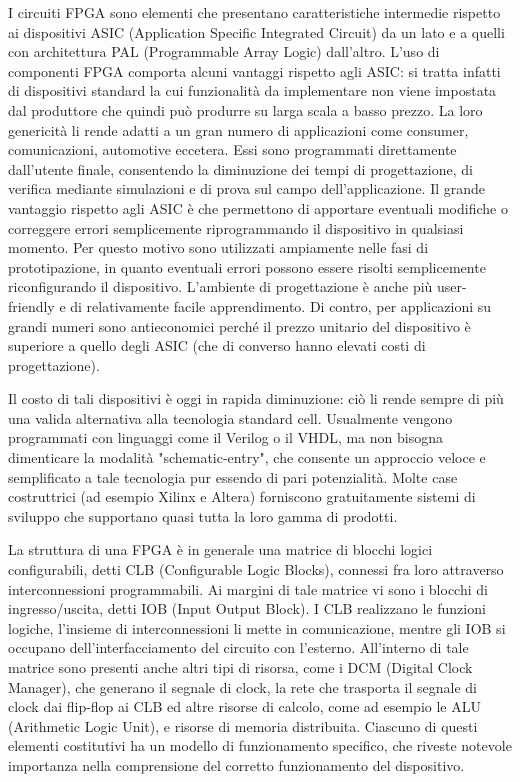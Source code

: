 \documentclass[a4paper,titlepage]{book}
\begin{document}
I circuiti FPGA sono elementi che presentano caratteristiche intermedie rispetto ai dispositivi ASIC (Application Specific Integrated Circuit) da un lato e a quelli con architettura PAL (Programmable Array Logic) dall'altro. L'uso di componenti FPGA comporta alcuni vantaggi rispetto agli ASIC: si tratta infatti di dispositivi standard la cui funzionalità da implementare non viene impostata dal produttore che quindi può produrre su larga scala a basso prezzo. La loro genericità li rende adatti a un gran numero di applicazioni come consumer, comunicazioni, automotive eccetera. Essi sono programmati direttamente dall'utente finale, consentendo la diminuzione dei tempi di progettazione, di verifica mediante simulazioni e di prova sul campo dell'applicazione. Il grande vantaggio rispetto agli ASIC è che permettono di apportare eventuali modifiche o correggere errori semplicemente riprogrammando il dispositivo in qualsiasi momento. Per questo motivo sono utilizzati ampiamente nelle fasi di prototipazione, in quanto eventuali errori possono essere risolti semplicemente riconfigurando il dispositivo. L'ambiente di progettazione è anche più user-friendly e di relativamente facile apprendimento. Di contro, per applicazioni su grandi numeri sono antieconomici perché il prezzo unitario del dispositivo è superiore a quello degli ASIC (che di converso hanno elevati costi di progettazione).

Il costo di tali dispositivi è oggi in rapida diminuzione: ciò li rende sempre di più una valida alternativa alla tecnologia standard cell. Usualmente vengono programmati con linguaggi come il Verilog o il VHDL, ma non bisogna dimenticare la modalità "schematic-entry", che consente un approccio veloce e semplificato a tale tecnologia pur essendo di pari potenzialità. Molte case costruttrici (ad esempio Xilinx e Altera) forniscono gratuitamente sistemi di sviluppo che supportano quasi tutta la loro gamma di prodotti.

La struttura di una FPGA è in generale una matrice di blocchi logici configurabili, detti CLB (Configurable Logic Blocks), connessi fra loro attraverso interconnessioni programmabili. Ai margini di tale matrice vi sono i blocchi di ingresso/uscita, detti IOB (Input Output Block). I CLB realizzano le funzioni logiche, l'insieme di interconnessioni li mette in comunicazione, mentre gli IOB si occupano dell'interfacciamento del circuito con l'esterno. All'interno di tale matrice sono presenti anche altri tipi di risorsa, come i DCM (Digital Clock Manager), che generano il segnale di clock, la rete che trasporta il segnale di clock dai flip-flop ai CLB ed altre risorse di calcolo, come ad esempio le ALU (Arithmetic Logic Unit), e risorse di memoria distribuita. Ciascuno di questi elementi costitutivi ha un modello di funzionamento specifico, che riveste notevole importanza nella comprensione del corretto funzionamento del dispositivo.
\end{document}
